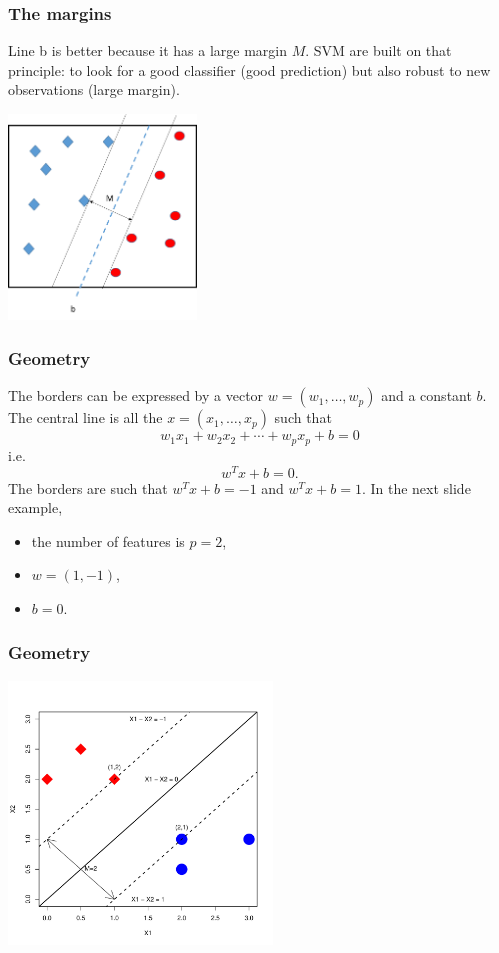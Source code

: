 \begin{frame}
\frametitle{The margins}
Line b is better because it has a large margin $M$. SVM are built on that principle: to look for a good classifier (good prediction) but also robust to new observations (large margin).
\begin{center}
\includegraphics[width=5cm]{../../Graphs/SVM_Borders_3.png} 
\end{center}
\end{frame}
\begin{frame}
\frametitle{Geometry}
The borders can be expressed by a vector $w=(w_1,\ldots,w_p)$ and a constant $b$. The central line is all the $x=(x_1,\ldots,x_p)$ such that
$$
w_1x_1 + w_2x_2 + \cdots + w_p x_p + b = 0
$$
i.e.
$$
w^T x + b = 0.
$$
The borders are such that $w^T x + b = -1$ and $w^T x + b = 1$. In the next slide example,
\begin{itemize}
\item the number of features is $p=2$,
\item $w=(1,-1)$, 
\item $b=0$.
\end{itemize}
\end{frame}
\begin{frame}
\frametitle{Geometry}
\begin{center}
\includegraphics[width=7cm]{../../Graphs/SVM_Borders_4.pdf}
\end{center}
\end{frame}
